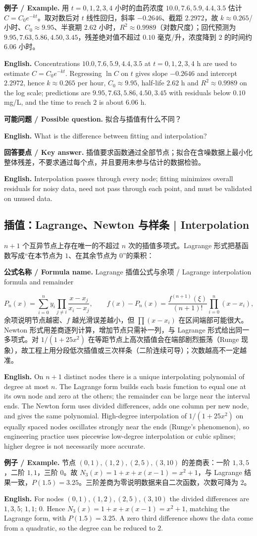 \documentclass[UTF8,11pt,a4paper]{ctexart}
\newcommand{\EN}[1]{\par\noindent\textbf{English.} #1\par}
\newcommand{\FORMULA}[2]{\par\noindent\textbf{公式名称 / Formula name.} #1 / #2\par}
\newcommand{\EX}[2]{\par\noindent\textbf{例子 / Example.} #1\par\EN{#2}}
\newcommand{\ASK}[4]{\par\noindent\textbf{可能问题 / Possible question.} #1\par\EN{#2}\noindent\textbf{回答要点 / Key answer.} #3\par\EN{#4}\smallskip}
\begin{document}
\EX{用 $t=0,1,2,3,4$ 小时的血药浓度 $10.0,7.6,5.9,4.4,3.5$ 估计 $C=C_0e^{-kt}$。取对数后对 $t$ 线性回归，斜率 $-0.2646$、截距 $2.2972$，故 $k\approx0.265$/小时、$C_0\approx9.95$、半衰期 $2.62$ 小时，$R^2\approx0.9989$（对数尺度）；回代预测为 $9.95,7.63,5.86,4.50,3.45$，残差绝对值不超过 $0.10$ 毫克/升，浓度降到 $2$ 的时间约 $6.06$ 小时。}{Concentrations $10.0,7.6,5.9,4.4,3.5$ at $t=0,1,2,3,4$ h are used to estimate $C=C_0e^{-kt}$. Regressing $\ln C$ on $t$ gives slope $-0.2646$ and intercept $2.2972$, hence $k\approx0.265$ per hour, $C_0\approx9.95$, half-life $2.62$ h and $R^2\approx0.9989$ on the log scale; predictions are $9.95,7.63,5.86,4.50,3.45$ with residuals below $0.10$ mg/L, and the time to reach $2$ is about $6.06$ h.}
\ASK{拟合与插值有什么不同？}{What is the difference between fitting and interpolation?}{插值要求函数通过全部节点；拟合在含噪数据上最小化整体残差，不要求通过每个点，并且要用未参与估计的数据检验。}{Interpolation passes through every node; fitting minimizes overall residuals for noisy data, need not pass through each point, and must be validated on unused data.}

\subsection{插值：Lagrange、Newton 与样条 | Interpolation}
$n+1$ 个互异节点上存在唯一的不超过 $n$ 次的插值多项式。Lagrange 形式把基函数写成“在本节点为 $1$、在其余节点为 $0$”的乘积：
\FORMULA{Lagrange 插值公式与余项}{Lagrange interpolation formula and remainder}
\[
P_n(x)=\sum_{i=0}^{n}y_i\prod_{j\ne i}\frac{x-x_j}{x_i-x_j},\qquad
f(x)-P_n(x)=\frac{f^{(n+1)}(\xi)}{(n+1)!}\prod_{i=0}^{n}(x-x_i),
\]
余项说明节点越密、$f$ 越光滑误差越小，但 $\prod(x-x_i)$ 在区间端部可能很大。Newton 形式用差商逐列计算，增加节点只需补一列，与 Lagrange 形式给出同一多项式。对 $1/(1+25x^2)$ 在等距节点上高次插值会在端部剧烈振荡（Runge 现象），故工程上用分段低次插值或三次样条（二阶连续可导）；次数越高不一定越准。
\EN{On $n+1$ distinct nodes there is a unique interpolating polynomial of degree at most $n$. The Lagrange form builds each basis function to equal one at its own node and zero at the others; the remainder can be large near the interval ends. The Newton form uses divided differences, adds one column per new node, and gives the same polynomial. High-degree interpolation of $1/(1+25x^2)$ on equally spaced nodes oscillates strongly near the ends (Runge's phenomenon), so engineering practice uses piecewise low-degree interpolation or cubic splines; higher degree is not necessarily more accurate.}
\EX{节点 $(0,1),(1,2),(2,5),(3,10)$ 的差商表：一阶 $1,3,5$，二阶 $1,1$，三阶 $0$。故 $N_3(x)=1+x+x(x-1)=x^2+1$，与 Lagrange 结果一致，$P(1.5)=3.25$。三阶差商为零说明数据来自二次函数，次数可降为 $2$。}{For nodes $(0,1),(1,2),(2,5),(3,10)$ the divided differences are $1,3,5$; $1,1$; $0$. Hence $N_3(x)=1+x+x(x-1)=x^2+1$, matching the Lagrange form, with $P(1.5)=3.25$. A zero third difference shows the data come from a quadratic, so the degree can be reduced to $2$.}
\end{document}
